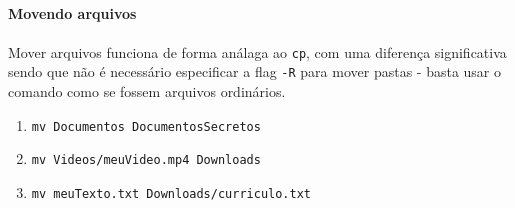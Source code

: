 \documentclass{article}
\begin{document}
	
	\paragraph{Movendo arquivos}
	\paragraph{}

	Mover arquivos funciona de forma análaga ao \texttt{cp}, com uma diferença significativa sendo que não é necessário 
	especificar a flag \texttt{-R} para mover pastas - basta usar o comando como se fossem arquivos ordinários. 

	\begin{enumerate} 
		\item{\texttt{mv Documentos DocumentosSecretos}} 
		\item{\texttt{mv Videos/meuVideo.mp4 Downloads}} 
		\item{\texttt{mv meuTexto.txt Downloads/curriculo.txt}} 
	\end{enumerate} 
\end{document}
